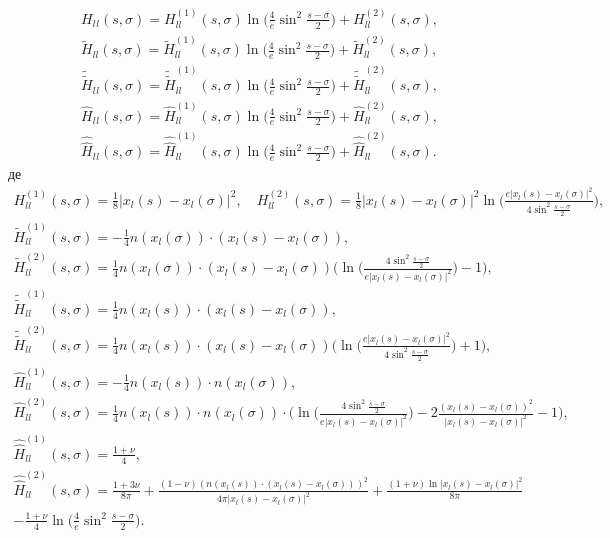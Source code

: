 \documentclass[12pt]{report}
\begin{document}
 \begin{gather}
 	H_l{_l}(s, \sigma)=H^{(1)}_{ll}(s, \sigma)\ln\bigg(\frac{4}{e}\sin^2\frac{s-\sigma}{2}\bigg)+H^{(2)}_{ll}(s, \sigma), \\
	\tilde{H}_{ll}(s, \sigma)=\tilde{H}^{(1)}_{ll}(s, \sigma)\ln\bigg(\frac{4}{e}\sin^2\frac{s-\sigma}{2}\bigg)+\tilde{H}^{(2)}_{ll}(s, \sigma), \\
	\tilde{\tilde{H}}_l{_l}(s, \sigma)=\tilde{\tilde{H}}^{(1)}_{ll}(s, \sigma)\ln\bigg(\frac{4}{e}\sin^2\frac{s-\sigma}{2}\bigg)+\tilde{\tilde{H}}^{(2)}_{ll}(s, \sigma), \\
	\hat{H}_l{_l}(s, \sigma)=\hat{H}^{(1)}_{ll}(s, \sigma)\ln\bigg(\frac{4}{e}\sin^2\frac{s-\sigma}{2}\bigg)+\hat{H}^{(2)}_{ll}(s, \sigma), \\ 
	\hat{\hat{H}}_l{_l}(s, \sigma)=\hat{\hat{H}}^{(1)}_{ll}(s, \sigma)\ln\bigg(\frac{4}{e}\sin^2\frac{s-\sigma}{2}\bigg)+\hat{\hat{H}}^{(2)}_{ll}(s, \sigma).
 \end{gather}
 де 
\begin{gather*}
	H^{(1)}_{ll}(s, \sigma)=\frac{1}{8}|x_l(s)-x_l(\sigma)|^2, \quad H^{(2)}_{ll}(s, \sigma)=\frac{1}{8}|x_l(s)-x_l(\sigma)|^2\ln\Big(\frac{e|x_l(s)-x_l(\sigma)|^2}{4\sin^2\frac{s-\sigma}{2}}\Big), \\
	\tilde{H}^{(1)}_{ll}(s, \sigma)=-\frac{1}{4}n(x_l(\sigma))\cdot(x_l(s)-x_l(\sigma)), \\
	 \tilde{H}^{(2)}_{ll}(s, \sigma)= \frac{1}{4}n(x_l(\sigma))\cdot(x_l(s)-x_l(\sigma))\bigg(\ln\Big(\frac{4\sin^2\frac{s-\sigma}{2}}{e|x_l(s)-x_l(\sigma)|^2}\Big)-1\bigg),\\
	\tilde{\tilde{H}}^{(1)}_{ll}(s, \sigma)=\frac{1}{4}n(x_l(s))\cdot(x_l(s)-x_l(\sigma)), \\
	 \tilde{\tilde{H}}^{(2)}_{ll}(s, \sigma)= \frac{1}{4}n(x_l(s))\cdot(x_l(s)-x_l(\sigma))\bigg(\ln\Big(\frac{e|x_l(s)-x_l(\sigma)|^2}{4\sin^2\frac{s-\sigma}{2}}\Big)+1\bigg),\\
	\hat{H}^{(1)}_{ll}(s, \sigma)= -\frac{1}{4}n(x_l(s))\cdot n(x_l(\sigma)), \\
	 \hat{H}^{(2)}_{ll}(s, \sigma)=\frac{1}{4}n(x_l(s))\cdot n(x_l(\sigma))\cdot\bigg(\ln\Big(\frac{4\sin^2\frac{s-\sigma}{2}}{e|x_l(s)-x_l(\sigma)|^2}\Big)-2\frac{(x_l(s)-x_l(\sigma))^2}{|x_l(s)-x_l(\sigma)|^2} -1\bigg), \\
	 \hat{\hat{H}}^{(1)}_{ll}(s, \sigma)= \frac{1+\nu}{4}, \\
	 \hat{\hat{H}}^{(2)}_{ll}(s, \sigma) = \frac{1+3\nu}{8\pi}+\frac{(1-\nu)(n(x_l(s))\cdot(x_l(s)-x_l(\sigma)))^2}{4\pi|x_l(s)-x_l(\sigma)|^2}+\frac{(1+\nu)\ln|x_l(s)-x_l(\sigma)|^2}{8\pi}\\
	-\frac{1+\nu}{4}\ln\bigg(\frac{4}{e}\sin^2\frac{s-\sigma}{2}\bigg).
 \end{gather*}
 
\end{document}
